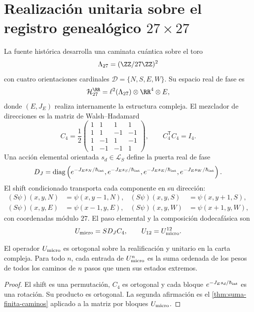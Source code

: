 \section{Realización unitaria sobre el registro genealógico \(27\times27\)}

La fuente histórica desarrolla una caminata cuántica sobre el toro
\[
 \Lambda_{27}=(\ZZ/27\ZZ)^2
\]
con cuatro orientaciones cardinales
\(\mathcal D=\{N,S,E,W\}\). Su espacio real de fase es
\[
 \mathcal H_{27}^{\RR}
 =\ell^2(\Lambda_{27})\otimes\RR^4\otimes E,
\]
donde \((E,J_E)\) realiza internamente la estructura compleja. El mezclador
de direcciones es la matriz de Walsh--Hadamard
\[
 C_4=\frac12
 \begin{pmatrix}
 1&1&1&1\\
 1&1&-1&-1\\
 1&-1&1&-1\\
 1&-1&-1&1
 \end{pmatrix},
 \qquad C_4^{\mathsf T}C_4=I_4.
\]
Una acción elemental orientada \(s_d\in\mathcal L_S\) define la puerta
real de fase
\[
 D_J=\operatorname{diag}
 \left(
  e^{-J_Es_N/\hbar_{\rm int}},
  e^{-J_Es_S/\hbar_{\rm int}},
  e^{-J_Es_E/\hbar_{\rm int}},
  e^{-J_Es_W/\hbar_{\rm int}}
 \right).
\]
El shift condicionado transporta cada componente en su dirección:
\begin{align*}
 (S\psi)(x,y,N)&=\psi(x,y-1,N),&
 (S\psi)(x,y,S)&=\psi(x,y+1,S),\\
 (S\psi)(x,y,E)&=\psi(x-1,y,E),&
 (S\psi)(x,y,W)&=\psi(x+1,y,W),
\end{align*}
con coordenadas módulo \(27\). El paso elemental y la composición
dodecafásica son
\begin{equation}
 U_{\rm micro}=S D_J C_4,
 \qquad
 U_{12}=U_{\rm micro}^{12}.
 \label{eq:unitario-ledger-27}
\end{equation}

\begin{proposition}
El operador \(U_{\rm micro}\) es ortogonal sobre la realificación y unitario
en la carta compleja. Para todo \(n\), cada entrada de
\(U_{\rm micro}^n\) es la suma ordenada de los pesos de todos los caminos de
\(n\) pasos que unen sus estados extremos.
\end{proposition}

\begin{proof}
El shift es una permutación, \(C_4\) es ortogonal y cada bloque
\(e^{-J_Es_d/\hbar_{\rm int}}\) es una rotación. Su producto es ortogonal.
La segunda afirmación es el
\cref{thm:suma-finita-caminos} aplicado a la matriz por bloques
\(U_{\rm micro}\).
\end{proof}

